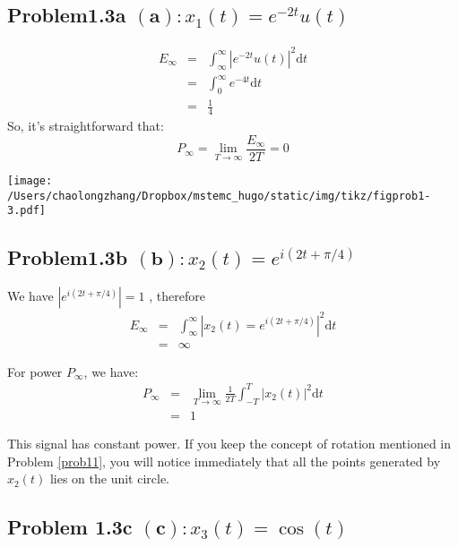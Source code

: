 \documentclass[koma,a4paper,utopia,12pt,listings-color,microtype,paralist,colorlinks,urlcolor=red]{org-article}
\begin{document}
\subsection{Problem1.3a \(\mathbf{(a)}: x_{1}(t)= e^{-2t}u(t)\)}
\label{sec:orge15cb02}


\begin{eqnarray*}
E_{\infty}  & =  & \int_{\infty}^{\infty} |e^{-2t}u(t)|^{2} \mathrm{d}t \\
&=& \int_{0}^{\infty} e^{-4t} \mathrm{d}t \\
&=& \frac{1}{4}
\end{eqnarray*}
So, it's straightforward that:
\begin{equation}
\label{eq:5}
P_{\infty} = \lim_{T\to \infty} \frac{E_{\infty}}{2T}  = 0
\end{equation}


\begin{center}
\texttt{[image: /Users/chaolongzhang/Dropbox/mstemc\_hugo/static/img/tikz/figprob1-3.pdf]}
\end{center}



\subsection{Problem1.3b \(\mathbf{(b)}: x_{2}(t)= e^{i(2t+\pi/4)}\)}
\label{sec:orgf93273c}

We have \(|e^{i(2t+\pi/4)}| = 1\) , therefore
\begin{eqnarray*}
E_{\infty}&=& \int_{\infty}^{\infty} |x_{2}(t)= e^{i(2t+\pi/4)}|^{2} \mathrm{d}t \\
&=& \infty
\end{eqnarray*}

For power \(P_{\infty}\), we have:
\begin{eqnarray*}
P_{\infty}&= &\lim_{T\to\infty} \frac{1}{2T}\int_{-T}^{T} |x_{2}(t)|^{2} \mathrm{d}t  \\
&=& 1
\end{eqnarray*}

This signal has constant power. If you keep the concept of rotation mentioned in
Problem \ref{prob11}, you will notice immediately that all the points generated by
\(x_{2}(t)\) lies on the unit circle.

\subsection{Problem 1.3c \(\mathbf{(c)}:x_{3}(t)=\cos(t)\)}
\label{sec:org2d00fa8}
\end{document}
